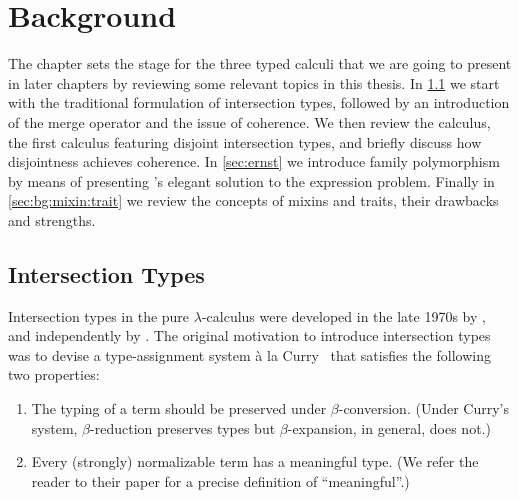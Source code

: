 
\chapter{Background}
\label{chap:background}

The chapter sets the stage for the three typed calculi that we are going to
present in later chapters by reviewing some relevant topics in this thesis. In
\cref{bg:sec:intersection} we start with the traditional formulation of
intersection types, followed by an introduction of the merge operator and the
issue of coherence. We then review the \oname calculus, the first calculus
featuring disjoint intersection types, and briefly discuss how disjointness
achieves coherence. In \cref{sec:ernst} we introduce family polymorphism by
means of presenting \citeauthor{Ernst_2001}'s elegant solution to the expression problem.
Finally in \cref{sec:bg:mixin:trait} we review the concepts of mixins and
traits, their drawbacks and strengths.




\section{Intersection Types}
\label{bg:sec:intersection}


Intersection types in the pure $\lambda$-calculus were developed in the late
1970s by \citet{coppoInter}, and independently by \citet{pottinger1980type}. The
original motivation to introduce intersection types was to devise a
type-assignment system \`a la Curry~\citep{CurryFeys} that satisfies the
following two properties:
\begin{enumerate}
\item The typing of a term should be preserved under $\beta$-conversion. (Under
  Curry's system, $\beta$-reduction preserves types but $\beta$-expansion, in
  general, does not.)
\item Every (strongly) normalizable term has a meaningful type. (We refer the
  reader to their paper for a precise definition of ``meaningful''.)
\end{enumerate}

